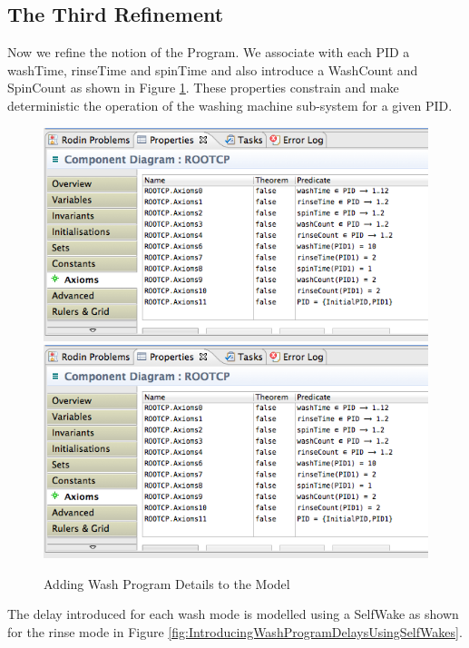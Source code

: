 \subsection{The Third Refinement}
\label{sec:component_diagrams-tutorial_thirdRefinement}

 
 
Now we refine the notion of the Program. We associate with each PID a washTime, rinseTime and spinTime and also introduce a WashCount and SpinCount as shown in Figure \ref{fig:AddingWashProgramDetailsToTheModel}. These properties constrain and make deterministic the operation of the washing machine sub-system for a given PID.
 
 \begin{figure}[!htbp]
  \centering
  \ifplastex
  \includegraphics[width=1024]{figures/image36.png}
  \else
  \includegraphics[width=1\textwidth]{figures/image36.png}
  \fi
  \caption{Adding Wash Program Details to the Model}
  \label{fig:AddingWashProgramDetailsToTheModel}
\end{figure} 
 
The delay introduced for each wash mode is modelled using a SelfWake as shown for the rinse mode in Figure \ref{fig:IntroducingWashProgramDelaysUsingSelfWakes}.
 
